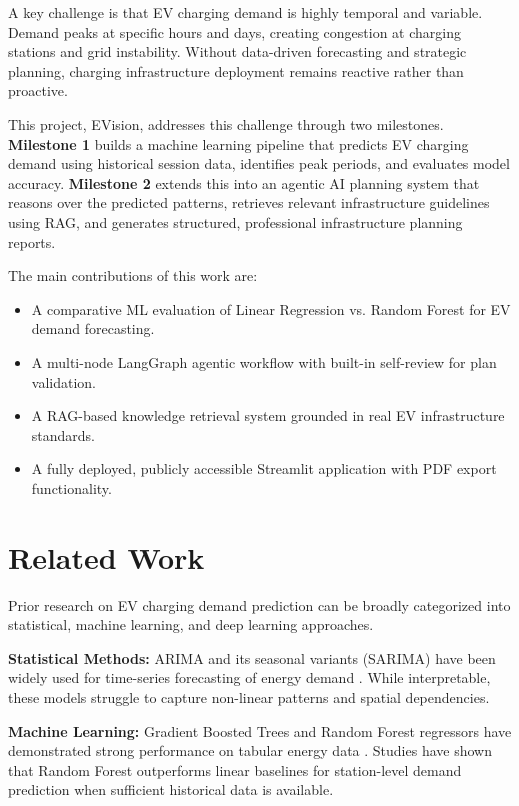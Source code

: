 \documentclass[conference]{IEEEtran}
\begin{document}
A key challenge is that EV charging demand is highly temporal and variable. Demand peaks at specific hours and days, creating congestion at charging stations and grid instability. Without data-driven forecasting and strategic planning, charging infrastructure deployment remains reactive rather than proactive.

This project, EVision, addresses this challenge through two milestones. \textbf{Milestone 1} builds a machine learning pipeline that predicts EV charging demand using historical session data, identifies peak periods, and evaluates model accuracy. \textbf{Milestone 2} extends this into an agentic AI planning system that reasons over the predicted patterns, retrieves relevant infrastructure guidelines using RAG, and generates structured, professional infrastructure planning reports.

The main contributions of this work are:
\begin{itemize}
    \item A comparative ML evaluation of Linear Regression vs. Random Forest for EV demand forecasting.
    \item A multi-node LangGraph agentic workflow with built-in self-review for plan validation.
    \item A RAG-based knowledge retrieval system grounded in real EV infrastructure standards.
    \item A fully deployed, publicly accessible Streamlit application with PDF export functionality.
\end{itemize}

\section{Related Work}

Prior research on EV charging demand prediction can be broadly categorized into statistical, machine learning, and deep learning approaches.

\textbf{Statistical Methods:} ARIMA and its seasonal variants (SARIMA) have been widely used for time-series forecasting of energy demand \cite{box2015timeseriesanalysis}. While interpretable, these models struggle to capture non-linear patterns and spatial dependencies.

\textbf{Machine Learning:} Gradient Boosted Trees and Random Forest regressors have demonstrated strong performance on tabular energy data \cite{breiman2001random}. Studies have shown that Random Forest outperforms linear baselines for station-level demand prediction when sufficient historical data is available.
\end{document}
